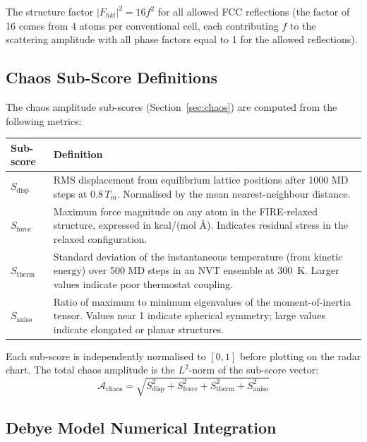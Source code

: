 \documentclass[11pt,a4paper]{article}
\begin{document}
\noindent The structure factor $|F_{hkl}|^2 = 16f^2$ for all allowed
FCC reflections (the factor of 16 comes from 4 atoms per conventional
cell, each contributing $f$ to the scattering amplitude with all phase
factors equal to 1 for the allowed reflections).

\subsection{Chaos Sub-Score Definitions}

The chaos amplitude sub-scores (Section~\ref{sec:chaos}) are computed
from the following metrics:

\begin{center}
\begin{tabular}{lp{9cm}}
\toprule
\textbf{Sub-score} & \textbf{Definition} \\
\midrule
$S_{\text{disp}}$ & RMS displacement from equilibrium lattice positions
  after 1000 MD steps at $0.8\,T_m$.  Normalised by the mean
  nearest-neighbour distance. \\
$S_{\text{force}}$ & Maximum force magnitude on any atom in the
  FIRE-relaxed structure, expressed in kcal/(mol \AA).  Indicates
  residual stress in the relaxed configuration. \\
$S_{\text{therm}}$ & Standard deviation of the instantaneous
  temperature (from kinetic energy) over 500 MD steps in an NVT
  ensemble at $300$~K.  Larger values indicate poor thermostat
  coupling. \\
$S_{\text{aniso}}$ & Ratio of maximum to minimum eigenvalues of the
  moment-of-inertia tensor.  Values near 1 indicate spherical
  symmetry; large values indicate elongated or planar structures. \\
\bottomrule
\end{tabular}
\end{center}

\noindent Each sub-score is independently normalised to $[0, 1]$ before
plotting on the radar chart.  The total chaos amplitude is the
$L^2$-norm of the sub-score vector:
\begin{equation}
  \mathcal{A}_{\text{chaos}} = \sqrt{S_{\text{disp}}^2 + S_{\text{force}}^2
    + S_{\text{therm}}^2 + S_{\text{aniso}}^2}
\end{equation}

\subsection{Debye Model Numerical Integration}
\end{document}
